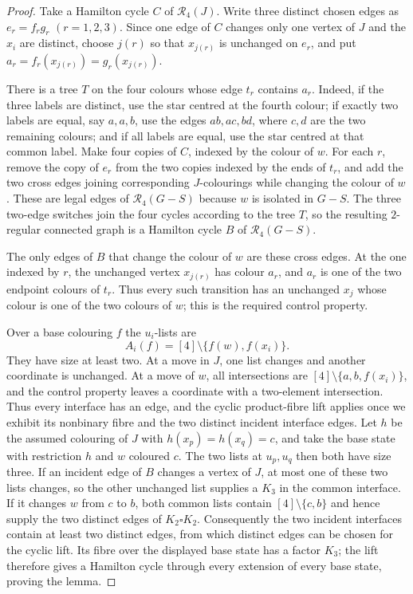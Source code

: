 \documentclass[11pt]{article}
\theoremstyle{remark}
\newcommand{\R}{\mathcal R}
\numberwithin{equation}{section}
\numberwithin{table}{section}
\begin{document}
\begin{proof}
Take a Hamilton cycle $C$ of $\R_4(J)$.  Write three distinct chosen edges
as $e_r=f_rg_r$ $(r=1,2,3)$.  Since one edge of $C$ changes only one vertex
of $J$ and the $x_i$ are distinct, choose $j(r)$ so that $x_{j(r)}$ is
unchanged on $e_r$, and put
$a_r=f_r(x_{j(r)})=g_r(x_{j(r)})$.

There is a tree $T$ on the four colours whose edge $t_r$ contains $a_r$.
Indeed, if the three labels are distinct, use the star centred at the fourth
colour; if exactly two labels are equal, say $a,a,b$, use the edges
$ab,ac,bd$, where $c,d$ are the two remaining colours; and if all labels
are equal, use the star centred at that common label.  Make four copies of
$C$, indexed by the colour of $w$.  For each $r$, remove the copy of $e_r$
from the two copies indexed by the ends of $t_r$, and add the two cross
edges joining corresponding $J$-colourings while changing the colour of
$w$.  These are legal edges of $\R_4(G-S)$ because $w$ is isolated in
$G-S$.  The three two-edge switches join the four cycles according to the
tree $T$, so the resulting $2$-regular connected graph is a Hamilton cycle
$B$ of $\R_4(G-S)$.

The only edges of $B$ that change the colour of $w$ are these cross edges.
At the one indexed by $r$, the unchanged vertex $x_{j(r)}$ has colour $a_r$,
and $a_r$ is one of the two endpoint colours of $t_r$.  Thus every such
transition has an unchanged $x_j$ whose colour is one of the two colours of
$w$; this is the required control property.

Over a base colouring $f$ the $u_i$-lists are
\[
 A_i(f)=[4]\setminus\{f(w),f(x_i)\}.
\]
They have size at least two.  At a move in $J$, one list changes and another
coordinate is unchanged.  At a move of $w$, all intersections are
$[4]\setminus\{a,b,f(x_i)\}$, and the control property leaves a coordinate
with a two-element intersection.  Thus every interface has an edge, and the
cyclic product-fibre lift applies once we exhibit its nonbinary fibre and the
two distinct incident interface edges.  Let $h$ be the assumed colouring of
$J$ with $h(x_p)=h(x_q)=c$, and take the base state with restriction $h$ and
$w$ coloured $c$.  The two lists at $u_p,u_q$ then both have size three.  If
an incident edge of $B$ changes a vertex of $J$, at most one of these two
lists changes, so the other unchanged list supplies a $K_3$ in the common
interface.  If it changes $w$ from $c$ to $b$, both common lists contain
$[4]\setminus\{c,b\}$ and hence supply the two distinct edges of
$K_2\square K_2$.  Consequently the two incident interfaces contain at
least two distinct edges, from which distinct edges can be chosen for the
cyclic lift.  Its fibre over the displayed base state has a factor $K_3$;
the lift therefore gives a Hamilton cycle through every extension of every
base state, proving the lemma.
\end{proof}
\end{document}
